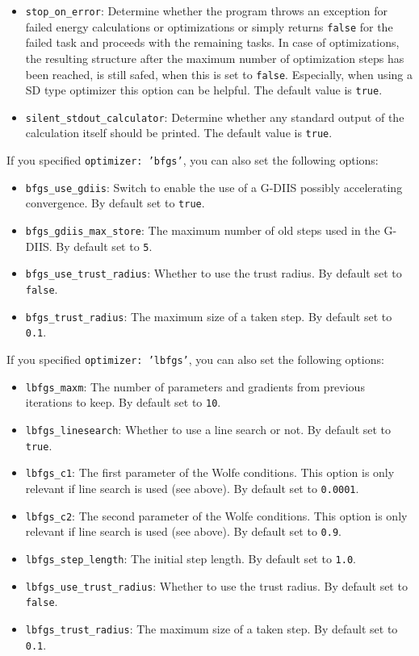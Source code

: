 \documentclass[]{tufte-book}
\begin{document}
\begin{itemize}
\item \texttt{stop\_on\_error}: Determine whether the program throws an exception for failed energy calculations or optimizations or simply returns \texttt{false} for the failed task and proceeds with the remaining tasks. In case of optimizations, the resulting structure after the maximum number of optimization steps has been reached, is still safed, when this is set to \texttt{false}. Especially, when using a SD type optimizer this option can be helpful. The default value is \texttt{true}.
\item \texttt{silent\_stdout\_calculator}: Determine whether any standard output of the calculation itself should be printed. The default value is \texttt{true}.
\end{itemize}

If you specified \texttt{optimizer: 'bfgs'}, you can also set the following options:
\begin{itemize}
\item \texttt{bfgs\_use\_gdiis}: Switch to enable the use of a G-DIIS possibly accelerating convergence. By default set to
\texttt{true}.
\item \texttt{bfgs\_gdiis\_max\_store}: The maximum number of old steps used in the G-DIIS. By default set to \texttt{5}.
\item \texttt{bfgs\_use\_trust\_radius}: Whether to use the trust radius. By default set to \texttt{false}.
\item \texttt{bfgs\_trust\_radius}: The maximum size of a taken step. By default set to \texttt{0.1}.
\end{itemize}

If you specified \texttt{optimizer: 'lbfgs'}, you can also set the following options:
\begin{itemize}
\item \texttt{lbfgs\_maxm}: The number of parameters and gradients from previous iterations to keep. By default set to
\texttt{10}.
\item \texttt{lbfgs\_linesearch}: Whether to use a line search or not. By default set to \texttt{true}.
\item \texttt{lbfgs\_c1}: The first parameter of the Wolfe conditions. This option is only relevant if line search is
used (see above). By default set to \texttt{0.0001}.
\item \texttt{lbfgs\_c2}:  The second parameter of the Wolfe conditions. This option is only relevant if line search is
used (see above). By default set to \texttt{0.9}.
\item \texttt{lbfgs\_step\_length}: The initial step length. By default set to \texttt{1.0}.
\item \texttt{lbfgs\_use\_trust\_radius}: Whether to use the trust radius. By default set to \texttt{false}.
\item \texttt{lbfgs\_trust\_radius}: The maximum size of a taken step. By default set to \texttt{0.1}.
\end{itemize}
\end{document}
